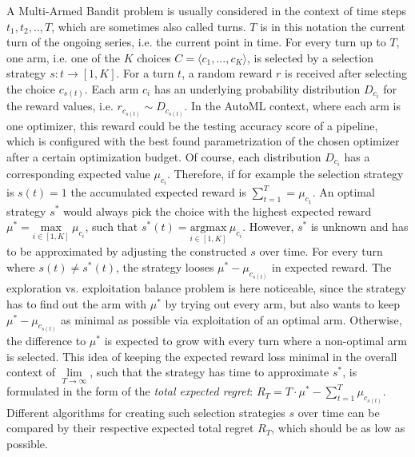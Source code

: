 A Multi-Armed Bandit problem is usually considered in the context of time steps $t_1, t_2, .., T$, which are sometimes also called turns.
$T$ is in this notation the current turn of the ongoing series, i.e. the current point in time.
For every turn up to $T$, one arm, i.e. one of the $K$ choices $C = \langle c_1, ..., c_K \rangle$, is selected by a selection strategy $s: t \rightarrow [1,K]$.\newline
For a turn $t$, a random reward $r$ is received after selecting the choice $c_{s(t)}$.
Each arm $c_i$ has an underlying probability distribution $D_{c_i}$ for the reward values, i.e. $r_{c_{s(t)}} \sim D_{c_{s(t)}}$.
In the AutoML context, where each arm is one optimizer, this reward could be the testing accuracy score of a pipeline, which is configured with the best found parametrization of the chosen optimizer after a certain optimization budget.\newline
Of course, each distribution $D_{c_i}$ has a corresponding expected value $\mu_{c_i}$.
Therefore, if for example the selection strategy is $s(t) = 1$ the accumulated expected reward is $\sum_{t=1}^T = \mu_{c_1}$.\newline
An optimal strategy $s^*$ would always pick the choice with the highest expected reward $\mu^* = \underset{i \in [1,K]}{\mathrm{max}} \> \mu_{c_i}$, such that $s^*(t) =\underset{i \in [1,K]}{\mathrm{argmax}} \> \mu_{c_i}$.
However, $s^*$ is unknown and has to be approximated by adjusting the constructed $s$ over time.\newline
For every turn where $s(t) \neq s^*(t)$, the strategy looses $\mu^* - \mu_{c_{s(t)}}$ in expected reward.
The exploration vs. exploitation balance problem is here noticeable, since the strategy has to find out the arm with $\mu^*$ by trying out every arm, but also wants to keep $\mu^* - \mu_{c_{s(t)}}$ as minimal as possible via exploitation of an optimal arm.
Otherwise, the difference to $\mu^*$ is expected to grow with every turn where a non-optimal arm is selected.
This idea of keeping the expected reward loss minimal in the overall context of $\underset{T \rightarrow \infty}{\lim}$, such that the strategy has time to approximate $s^*$, is formulated in the form of the \textit{total expected regret}: $R_T = T \cdot \mu^* - \sum_{t=1}^{T} \mu_{c_{s(t)}}$.
Different algorithms for creating such selection strategies $s$ over time can be compared by their respective expected total regret $R_T$, which should be as low as possible.

